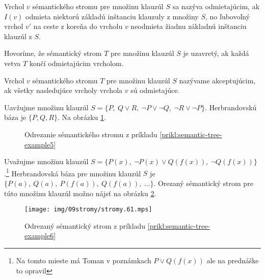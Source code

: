 \begin{definicia}
    Vrchol $v$ sémantického stromu pre množinu klauzúl $S$ sa
    nazýva odmietajúcim, ak  $I(v)$ odmieta niektorú základú inštanciu
    klauzuly z množiny $S$, no ľubovoľný vrchol $v'$  na ceste z koreňa 
    do vrcholu $v$
    neodmieta žiadnu základnú inštanciu klauzúl z $S$.
\end{definicia}

\begin{definicia}
    Hovoríme, že sémantický strom $T$ pre množinu klauzúl $S$
    je uzavretý, ak každá vetva $T$ končí odmietajúcim vrcholom.
\end{definicia}

\begin{definicia}
    Vrchol $v$ sémantického stromu $T$ pre  množinu klauzúl $S$ 
    nazývame akceptujúcim, ak všetky nasledujúce
    vrcholy vrchola $v$ sú odmietajúce.
\end{definicia}

\begin{priklad}
    \label{prikl:semantic-tree-example5}
    Uavžujme množinu klauzúl
    $S= \{ P,\ Q \lor R,\ \neg P \lor \neg Q,\ \neg R \lor \neg P \}$.
    Herbrandovskú báza je $\{P, Q, R\}$. Na obrázku
    \ref{fig:semantic-tree-example5}.

    \begin{figure}[h]
        \centering
        \caption{Odrezanie sémantického stromu z príkladu
                \ref{prikl:semantic-tree-example5}}
        \label{fig:semantic-tree-example5}
    \end{figure}
\end{priklad}



\begin{priklad}
    \label{prikl:semantic-tree-example6}
    Uvažujme množinu klauzúl $S=\{ P(x),\ \neg P(x) \lor Q(f(x)),\ \neg Q(f(x)) \}$.\footnote{
        Na tomto mieste má Toman v poznámkach $P \lor Q(f(x))$ ale na
        prednáške to opravil}
    Herbrandovská báza pre množinu klauzúl $S$ je
    $\{ P(a),\ Q(a),\ P(f(a)),\ Q(f(a)),\ \ldots \}$. Orezaný sémantický
    strom pre túto množinu klauzúl možno nájsť na obrázku
    \ref{fig:semantic-tree-example6}.

    \begin{figure}[h]
        \centering
        \texttt{[image: img/09stromy/stromy.61.mps]}
        \caption{Odrezaný sémantický strom z príkladu
                \ref{prikl:semantic-tree-example6}}
        \label{fig:semantic-tree-example6}
    \end{figure}
\end{priklad}


